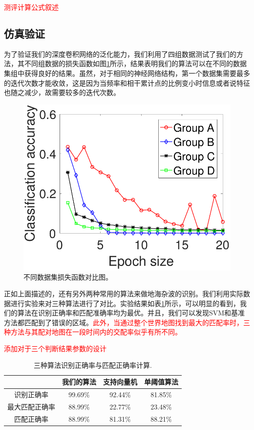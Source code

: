 \textcolor{red}{测评计算公式叙述}

\subsection{仿真验证}
为了验证我们的深度卷积网络的泛化能力，我们利用了四组数据测试了我们的方法，其不同组数据的损失函数如图\ref{fig:group_results}所示，结果表明我们的算法可以在不同的数据集组中获得良好的结果。虽然，对于相同的神经网络结构，第一个数据集需要最多的迭代次数才能收敛，这是因为当频率和相干累计点的比例变小时信息或者说特征也随之减少，故需要较多的迭代次数。
\begin{figure}[!t]
	\centering
	\includegraphics[width=\textwidth]{figures/group_results}
	\caption{不同数据集损失函数对比图。}
	\label{fig:group_results}
\end{figure}
正如上面描述的，还有另外两种常用的算法来做地海杂波的识别。我们利用实际数据进行实验来对三种算法进行了对比。实验结果如表\ref{tab:methods}所示，可以明显的看到，我们的算法在识别正确率和匹配准确率均为最优。并且，我们可以发现SVM和基准方法都匹配到了错误的区域。\textcolor{red}{此外，当通过整个世界地图找到最大的匹配率时，三种方法与其配对地图在一段时间内的交配率似乎有所不同。}

\textcolor{red}{添加对于三个判断结果参数的设计}
\begin{table}[!t]
	\renewcommand{\arraystretch}{1.3}
	\caption{三种算法识别正确率与匹配正确率计算.}
	\label{tab:methods}
	\centering
	\begin{tabular}{c|ccc}
		\hline
		& 我们的算法 & 支持向量机 & 单阈值算法 \\
		\hline
		识别正确率 & 99.69\% & 92.44\% & 81.85\% \\
		\hline
		最大匹配正确率 & 88.99\% & 22.77\% & 23.48\% \\
		\hline
		匹配正确率 & 88.99\% & 81.31\% & 88.21\% \\
		\hline
	\end{tabular}
\end{table}

